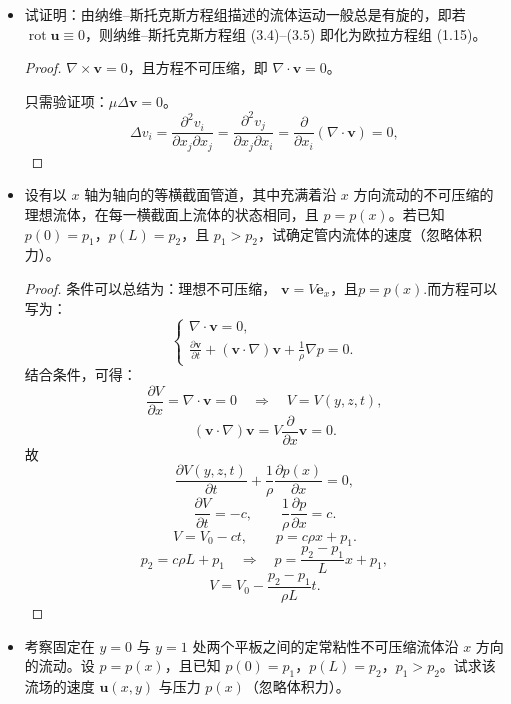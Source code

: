 \begin{itemize}
    \item[6.]试证明：由纳维--斯托克斯方程组描述的流体运动一般总是有旋的，即若 $\operatorname{rot}\boldsymbol{u}\equiv0$，则纳维--斯托克斯方程组 (3.4)--(3.5) 即化为欧拉方程组 (1.15)。

    \begin{proof}
    $\nabla\times\boldsymbol{v}=0$，且方程不可压缩，即
    $\nabla\cdot\boldsymbol{v}=0$。

    只需验证项：$\mu\Delta\boldsymbol{v}=0$。
    $$
    \Delta v_i
    =\frac{\partial^2v_i}{\partial x_j\partial x_j}
    =\frac{\partial^2v_j}{\partial x_j\partial x_i}
    =\frac{\partial}{\partial x_i}(\nabla\cdot\boldsymbol{v})
    =0,
    $$
    
    \end{proof}

    \item[7.]设有以 $x$ 轴为轴向的等横截面管道，其中充满着沿 $x$ 方向流动的不可压缩的理想流体，在每一横截面上流体的状态相同，且 $p=p(x)$。若已知 $p(0)=p_1$，$p(L)=p_2$，且 $p_1>p_2$，试确定管内流体的速度（忽略体积力）。

    \begin{proof}
    条件可以总结为：理想不可压缩，
    $\boldsymbol{v}=V\boldsymbol{e}_x$，且$p=p(x)$.而方程可以
    写为：
    $$
    \begin{cases}
    \nabla\cdot\boldsymbol{v}=0,\\[1mm]
    \displaystyle
    \frac{\partial\boldsymbol{v}}{\partial t}
    +(\boldsymbol{v}\cdot\nabla)\boldsymbol{v}
    +\frac{1}{\rho}\nabla p=0.
    \end{cases}
    $$
    结合条件，可得：
    $$
    \frac{\partial V}{\partial x}
    =\nabla\cdot\boldsymbol{v}=0
    \quad\Longrightarrow\quad
    V=V(y,z,t),
    $$
    $$
    (\boldsymbol{v}\cdot\nabla)\boldsymbol{v}
    =V\frac{\partial}{\partial x}\boldsymbol{v}=0.
    $$
    故
    $$
    \frac{\partial V(y,z,t)}{\partial t}
    +\frac{1}{\rho}\frac{\partial p(x)}{\partial x}=0,
    $$
    $$
    \frac{\partial V}{\partial t}=-c,\qquad
    \frac{1}{\rho}\frac{\partial p}{\partial x}=c.
    $$
    $$
    V=V_0-ct,\qquad
    p=c\rho x+p_1.
    $$
    $$
    p_2=c\rho L+p_1
    \quad\Longrightarrow\quad
    p=\frac{p_2-p_1}{L}x+p_1,
    $$
    $$
    V=V_0-\frac{p_2-p_1}{\rho L}t.
    $$
    \end{proof}

    \item[8.]考察固定在 $y=0$ 与 $y=1$ 处两个平板之间的定常粘性不可压缩流体沿 $x$ 方向的流动。设 $p=p(x)$，且已知 $p(0)=p_1$，$p(L)=p_2$，$p_1>p_2$。试求该流场的速度 $\boldsymbol{u}(x,y)$ 与压力 $p(x)$（忽略体积力）。


\end{itemize}
